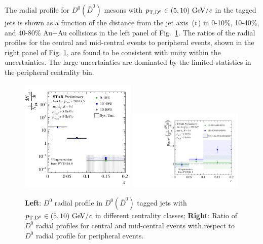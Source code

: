 \documentclass{appolb}
\begin{document}
The radial profile for $D^{0} (\bar{D}^{0})$ mesons with $p_{\rm T, D^{0}} \in (5, 10) \text{ GeV}/\textit{c}$ in the tagged jets is shown as a function of the distance from the jet \mbox{axis ($\rm r$)} in \mbox{0-10\%}, 10-40\%, and 40-80\% Au+Au collisions in the left panel of \mbox{Fig. \ref{fig:RadialProfile}.} The ratios of the radial profiles for the central and mid-central events to peripheral events, shown in the right panel of Fig. \ref{fig:RadialProfile}, are found to be consistent with unity within the uncertainties. The large uncertainties are dominated by the limited statistics in the peripheral centrality bin.

\begin{figure}[h]
    \centering
    \includegraphics[width=0.49\textwidth]{D0DeltaR_D0Pt5GeV_AuAu200GeV_Run14_STAR.pdf}
    \includegraphics[width=0.49\textwidth]{DeltaRRatio_D0Pt5GeV_AuAu200GeV_Run14_STAR.pdf}
    \caption{\textbf{Left}: $D^{0}$ radial profile in $D^{0} (\bar{D}^{0})$ tagged jets with $p_{\rm T, D^{0}} \in (5,10) \text{ GeV}/\textit{c}$ in different centrality classes; \textbf{Right}: Ratio of $D^{0}$ radial profiles for central and mid-central events with respect to $D^{0}$ radial profile for peripheral events.}
    \label{fig:RadialProfile}
\end{figure}
\end{document}
